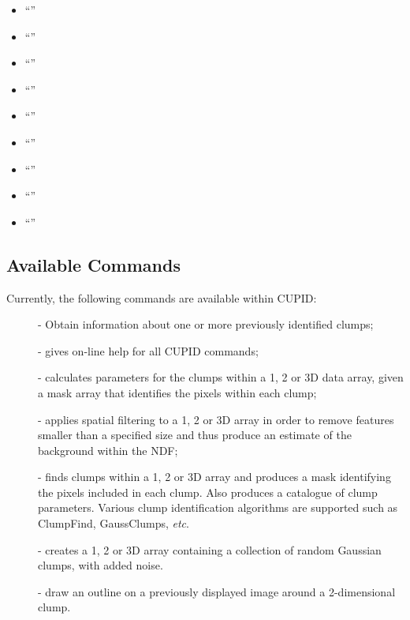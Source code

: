 \documentclass[twoside,11pt]{starlink}
\begin{document}
\begin{itemize}
\item ``''
\item ``''
\item ``''
\item ``''
\item ``''
\item ``''
\item ``''
\item ``''
\item ``''
\end{itemize}

\subsection{Available Commands}
Currently, the following commands are available within CUPID:
\begin{description}

\item[] - Obtain information about
one or more previously identified clumps;

\item[] - gives on-line help for all CUPID
commands;

\item[] - calculates parameters for
the clumps within a 1, 2 or 3D data array, given a mask array that identifies
the pixels within each clump;

\item[] - applies spatial filtering to a 1, 2
or 3D array in order to remove features smaller than a specified size and
thus produce an estimate of the background within the NDF;

\item[] - finds clumps within a 1, 2 or 3D
array and produces a mask identifying the pixels included in each clump.
Also produces a catalogue of clump parameters. Various clump
identification algorithms are supported such as ClumpFind, GaussClumps,
\emph{etc}.

\item[] - creates a 1, 2 or 3D array
containing a collection of random Gaussian clumps, with added noise.

\item[] - draw an outline on a
previously displayed image around a 2-dimensional clump.

\end{description}
\end{document}

